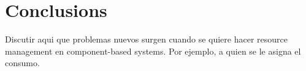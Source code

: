 \section{Conclusions}

Discutir aqui que problemas nuevos surgen cuando se quiere hacer resource management en component-based systems. Por ejemplo, a quien se le asigna el consumo.


